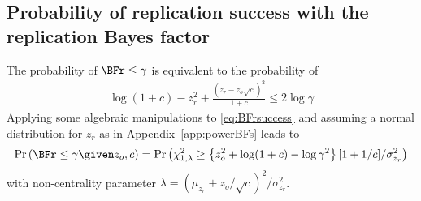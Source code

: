 \begin{subappendices}
\section{Probability of replication success with the replication Bayes factor}
\label{app:powerBFr}
The probability of $\BFr \leq \gamma$ is equivalent to the probability of
\begin{align}
  \label{eq:BFrsuccess}
  \log(1 + c) - z_{r}^{2} + \frac{(z_{r} - z_{o}\sqrt{c})^{2}}{1 + c}
  \leq  2 \log \gamma
\end{align}
Applying some algebraic manipulations to \eqref{eq:BFrsuccess} and assuming a
normal distribution for $z_{r}$ as in Appendix~\ref{app:powerBFs} leads to
\begin{align*}
  \Pr\left(\BFr \leq \gamma \given z_o, c\right) =
  \Pr\left(\chi^2_{1,\lambda} \geq \left\{z_{o}^{2} + \log(1 + c) - \log \gamma^{2}
  \right\} [1 + 1/c] / \sigma^2_{z_r}\right)
\end{align*}
with non-centrality parameter $\lambda = (\mu_{z_r} + z_{o}/\sqrt{c})^2/\sigma^2_{z_r}$.

\end{subappendices}



